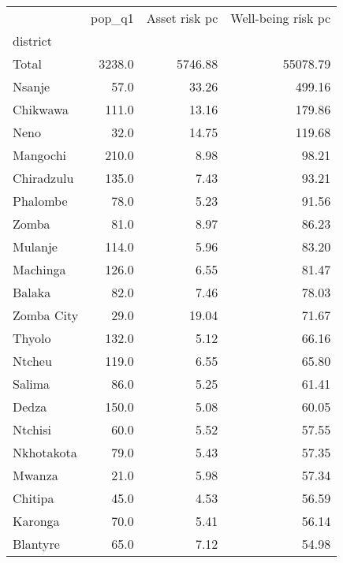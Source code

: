 \begin{tabular}{lrrr}
\toprule
{} &  pop\_q1 &  Asset risk pc &  Well-being risk pc \\
district      &         &                &                     \\
\midrule
Total         &  3238.0 &        5746.88 &            55078.79 \\
Nsanje        &    57.0 &          33.26 &              499.16 \\
Chikwawa      &   111.0 &          13.16 &              179.86 \\
Neno          &    32.0 &          14.75 &              119.68 \\
Mangochi      &   210.0 &           8.98 &               98.21 \\
Chiradzulu    &   135.0 &           7.43 &               93.21 \\
Phalombe      &    78.0 &           5.23 &               91.56 \\
Zomba         &    81.0 &           8.97 &               86.23 \\
Mulanje       &   114.0 &           5.96 &               83.20 \\
Machinga      &   126.0 &           6.55 &               81.47 \\
Balaka        &    82.0 &           7.46 &               78.03 \\
Zomba City    &    29.0 &          19.04 &               71.67 \\
Thyolo        &   132.0 &           5.12 &               66.16 \\
Ntcheu        &   119.0 &           6.55 &               65.80 \\
Salima        &    86.0 &           5.25 &               61.41 \\
Dedza         &   150.0 &           5.08 &               60.05 \\
Ntchisi       &    60.0 &           5.52 &               57.55 \\
Nkhotakota    &    79.0 &           5.43 &               57.35 \\
Mwanza        &    21.0 &           5.98 &               57.34 \\
Chitipa       &    45.0 &           4.53 &               56.59 \\
Karonga       &    70.0 &           5.41 &               56.14 \\
Blantyre      &    65.0 &           7.12 &               54.98 \\

\end{tabular}
